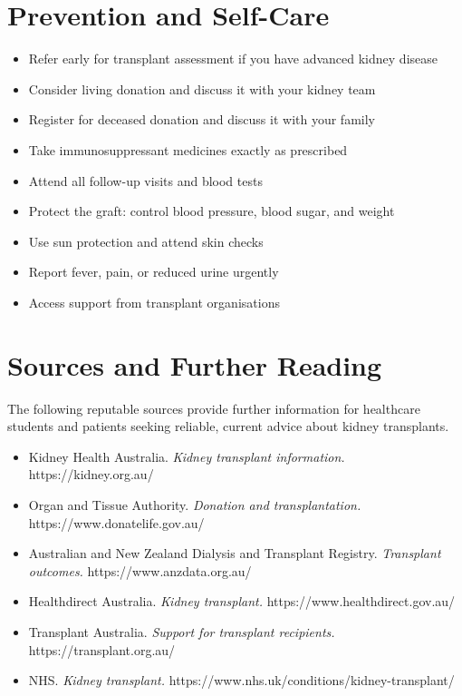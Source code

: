\section*{Prevention and Self-Care}
\begin{itemize}
    \item Refer early for transplant assessment if you have advanced kidney disease
    \item Consider living donation and discuss it with your kidney team
    \item Register for deceased donation and discuss it with your family
    \item Take immunosuppressant medicines exactly as prescribed
    \item Attend all follow-up visits and blood tests
    \item Protect the graft: control blood pressure, blood sugar, and weight
    \item Use sun protection and attend skin checks
    \item Report fever, pain, or reduced urine urgently
    \item Access support from transplant organisations
\end{itemize}

\section*{Sources and Further Reading}
The following reputable sources provide further information for healthcare students and patients seeking reliable, current advice about kidney transplants.
\begin{itemize}
    \item Kidney Health Australia. \textit{Kidney transplant information.} https://kidney.org.au/
    \item Organ and Tissue Authority. \textit{Donation and transplantation.} https://www.donatelife.gov.au/
    \item Australian and New Zealand Dialysis and Transplant Registry. \textit{Transplant outcomes.} https://www.anzdata.org.au/
    \item Healthdirect Australia. \textit{Kidney transplant.} https://www.healthdirect.gov.au/
    \item Transplant Australia. \textit{Support for transplant recipients.} https://transplant.org.au/
    \item NHS. \textit{Kidney transplant.} https://www.nhs.uk/conditions/kidney-transplant/
\end{itemize}
